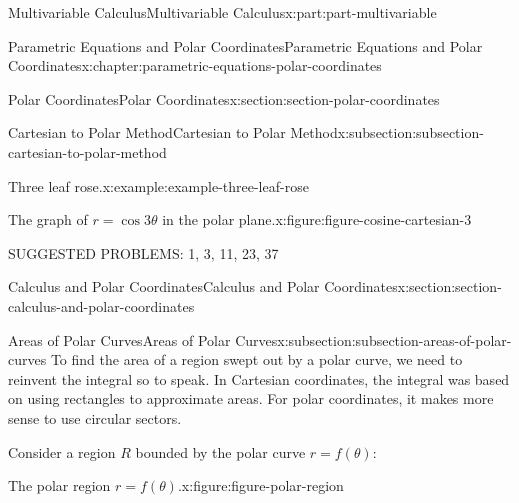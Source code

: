 \documentclass[twoside,10pt,]{tufte-book}
\numberwithin{equation}{part}
\begin{document}
\begin{partptx}{Multivariable Calculus}{}{Multivariable Calculus}{}{}{x:part:part-multivariable}
\begin{chapterptx}{Parametric Equations and Polar Coordinates}{}{Parametric Equations and Polar Coordinates}{}{}{x:chapter:parametric-equations-polar-coordinates}
\begin{sectionptx}{Polar Coordinates}{}{Polar Coordinates}{}{}{x:section:section-polar-coordinates}
\begin{subsectionptx}{Cartesian to Polar Method}{}{Cartesian to Polar Method}{}{}{x:subsection:subsection-cartesian-to-polar-method}
\begin{example}{Three leaf rose.}{x:example:example-three-leaf-rose}
\begin{figureptx}{The graph of \(r=\cos3\theta\) in the polar plane.}{x:figure:figure-cosine-cartesian-3}{}
\begin{image}{0}{1}{0}
{
}%
\end{image}%
\tcblower
\end{figureptx}%
\end{example}
SUGGESTED PROBLEMS: 1, 3, 11, 23, 37%
\end{subsectionptx}
\end{sectionptx}
%
%
\typeout{************************************************}
\typeout{************************************************}
%
\begin{sectionptx}{Calculus and Polar Coordinates}{}{Calculus and Polar Coordinates}{}{}{x:section:section-calculus-and-polar-coordinates}
%
%
\typeout{************************************************}
\typeout{************************************************}
%
\begin{subsectionptx}{Areas of Polar Curves}{}{Areas of Polar Curves}{}{}{x:subsection:subsection-areas-of-polar-curves}
To find the area of a region swept out by a polar curve, we need to reinvent the integral so to speak. In Cartesian coordinates, the integral was based on using rectangles to approximate areas. For polar coordinates, it makes more sense to use circular sectors.%
\par
Consider a region \(R\) bounded by the polar curve \(r = f(\theta)\):%
\begin{figureptx}{The polar region \(r = f(\theta)\).}{x:figure:figure-polar-region}{}%
\begin{image}{0}{1}{0}%
\end{image}
\end{figureptx}
\end{subsectionptx}
\end{sectionptx}
\end{chapterptx}
\end{partptx}
\end{document}
